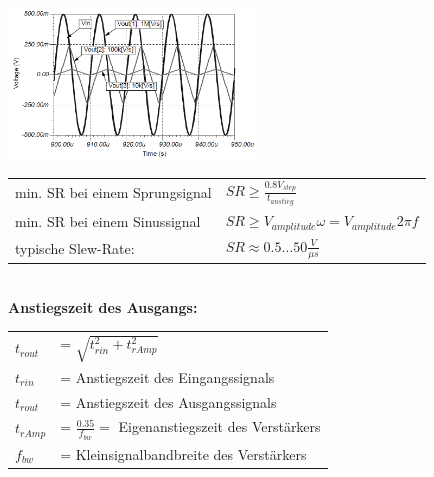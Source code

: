 			\begin{minipage}{8cm}
				\includegraphics[height=4cm]{./images/slew-rate.png}\\
			\end{minipage}
			\begin{minipage}{8cm}
						\begin{tabular}{ll}
							min. SR bei einem Sprungsignal &
							$SR\geq\frac{0.8V_{step}}{t_{anstieg}}$\\ 
							min. SR bei einem Sinussignal & 
							$SR\geq V_{amplitude}\omega=V_{amplitude}2\pi f$\\
							typische Slew-Rate: & $SR \approx 0.5 \dots 50 \frac{V}{\mu s}$
						\end{tabular} \\
			
				{\bf Anstiegszeit des Ausgangs:} \\
				\begin{tabular}{ll}
					$t_{rout}$ & = $\sqrt{t_{rin}^2 + t_{rAmp}^2}$ \\
					$t_{rin}$  & = Anstiegszeit des Eingangssignals \\
					$t_{rout}$ & = Anstiegszeit des Ausgangssignals \\
					$t_{rAmp}$ & = $\frac{0.35}{f_{bw}} = $ Eigenanstiegszeit des Verstärkers \\
					$f_{bw}$   & = Kleinsignalbandbreite des Verstärkers \\
				\end{tabular}
			\end{minipage}
			
